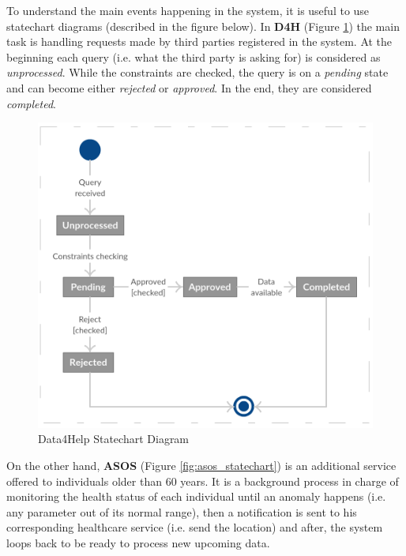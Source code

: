 \documentclass[a4paper, hidelinks, 12pt]{report}
\begin{document}
	To understand the main events happening in the system, it is useful to use statechart diagrams (described in the figure below). In \textbf {D4H} (Figure \ref{fig:d4h_statechart}) the main task is handling requests made by third parties registered in the system. At the beginning each query (i.e. what the third party is asking for) is considered as \textit{unprocessed}. While the constraints are checked, the query is on a \textit{pending} state and can become either \textit{rejected} or \textit{approved}. In the end, they are considered \textit{completed}. \\
	
	\begin{figure}[H]
		\centering
		\includegraphics[scale=0.55]{Diagrams/d4h_statechart.png}
		\caption[Data4Help Statechart Diagram]{Data4Help Statechart Diagram}
		\label{fig:d4h_statechart}
	\end{figure}
	
	On the other hand, \textbf{ASOS} (Figure \ref{fig:asos_statechart}) is an additional service offered to individuals older than 60 years. It is a background process in charge of monitoring the health status of each individual until an anomaly happens (i.e. any parameter out of its normal range), then a notification is sent to his corresponding healthcare service (i.e. send the location) and after, the system loops back to be ready to process new upcoming data. \\
	
\end{document}
